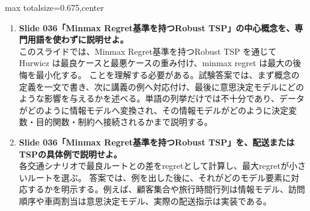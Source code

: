 \begin{adjustbox}{max totalsize={\textwidth}{0.675\textheight},center}
\begin{minipage}{\textwidth}
\begin{minipage}[t]{0.485\textwidth}
\begin{enumerate}
\item \textbf{Slide 036「Minmax Regret基準を持つRobust TSP」の中心概念を、専門用語を使わずに説明せよ。}\\このスライドでは、Minmax Regret基準を持つRobust TSP を通じて Hurwicz は最良ケースと最悪ケースの重み付け、minmax regret は最大の後悔を最小化する。 ことを理解する必要がある。試験答案では、まず概念の定義を一文で書き、次に講義の例へ対応付け、最後に意思決定モデルにどのような影響を与えるかを述べる。単語の列挙だけでは不十分であり、データがどのように情報モデルへ変換され、その情報モデルがどのように決定変数・目的関数・制約へ接続されるかまで説明する。
\item \textbf{Slide 036「Minmax Regret基準を持つRobust TSP」を、配送またはTSPの具体例で説明せよ。}\\各交通シナリオで最良ルートとの差をregretとして計算し、最大regretが小さいルートを選ぶ。 答案では、例を出した後に、それがどのモデル要素に対応するかを明示する。例えば、顧客集合や旅行時間行列は情報モデル、訪問順序や車両割当は意思決定モデル、実際の配送指示は実装である。
\end{enumerate}
\end{minipage}
\end{minipage}
\end{adjustbox}

